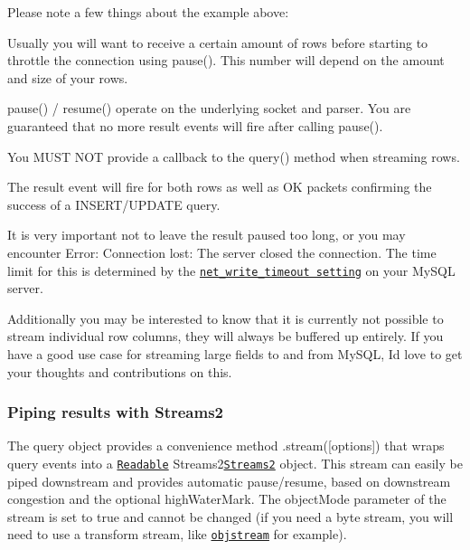 Please note a few things about the example above\+:


\begin{DoxyItemize}
\item Usually you will want to receive a certain amount of rows before starting to throttle the connection using {\ttfamily pause()}. This number will depend on the amount and size of your rows.
\item {\ttfamily pause()} / {\ttfamily resume()} operate on the underlying socket and parser. You are guaranteed that no more {\ttfamily \textquotesingle{}result\textquotesingle{}} events will fire after calling {\ttfamily pause()}.
\item You M\+U\+S\+T N\+O\+T provide a callback to the {\ttfamily query()} method when streaming rows.
\item The {\ttfamily \textquotesingle{}result\textquotesingle{}} event will fire for both rows as well as O\+K packets confirming the success of a I\+N\+S\+E\+R\+T/\+U\+P\+D\+A\+T\+E query.
\item It is very important not to leave the result paused too long, or you may encounter {\ttfamily Error\+: Connection lost\+: The server closed the connection.} The time limit for this is determined by the \href{https://dev.mysql.com/doc/refman/5.5/en/server-system-variables.html#sysvar_net_write_timeout}{\tt net\+\_\+write\+\_\+timeout setting} on your My\+S\+Q\+L server.
\end{DoxyItemize}

Additionally you may be interested to know that it is currently not possible to stream individual row columns, they will always be buffered up entirely. If you have a good use case for streaming large fields to and from My\+S\+Q\+L, I\textquotesingle{}d love to get your thoughts and contributions on this.

\subsubsection*{Piping results with Streams2}

The query object provides a convenience method {\ttfamily .stream(\mbox{[}options\mbox{]})} that wraps query events into a \href{http://nodejs.org/api/stream.html#stream_class_stream_readable}{\tt Readable} Streams2\href{http://blog.nodejs.org/2012/12/20/streams2/}{\tt Streams2} object. This stream can easily be piped downstream and provides automatic pause/resume, based on downstream congestion and the optional {\ttfamily high\+Water\+Mark}. The {\ttfamily object\+Mode} parameter of the stream is set to {\ttfamily true} and cannot be changed (if you need a byte stream, you will need to use a transform stream, like \href{https://www.npmjs.com/package/objstream}{\tt objstream} for example).

